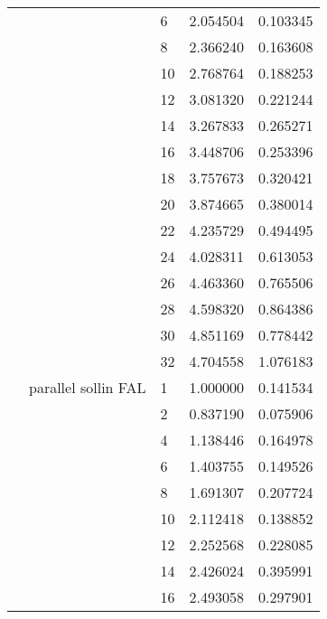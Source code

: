 \begin{tabular}{lllrr}
                      &                     & 6  &  2.054504 &  0.103345 \\
                      &                     & 8  &  2.366240 &  0.163608 \\
                      &                     & 10 &  2.768764 &  0.188253 \\
                      &                     & 12 &  3.081320 &  0.221244 \\
                      &                     & 14 &  3.267833 &  0.265271 \\
                      &                     & 16 &  3.448706 &  0.253396 \\
                      &                     & 18 &  3.757673 &  0.320421 \\
                      &                     & 20 &  3.874665 &  0.380014 \\
                      &                     & 22 &  4.235729 &  0.494495 \\
                      &                     & 24 &  4.028311 &  0.613053 \\
                      &                     & 26 &  4.463360 &  0.765506 \\
                      &                     & 28 &  4.598320 &  0.864386 \\
                      &                     & 30 &  4.851169 &  0.778442 \\
                      &                     & 32 &  4.704558 &  1.076183 \\
                      & parallel sollin FAL & 1  &  1.000000 &  0.141534 \\
                      &                     & 2  &  0.837190 &  0.075906 \\
                      &                     & 4  &  1.138446 &  0.164978 \\
                      &                     & 6  &  1.403755 &  0.149526 \\
                      &                     & 8  &  1.691307 &  0.207724 \\
                      &                     & 10 &  2.112418 &  0.138852 \\
                      &                     & 12 &  2.252568 &  0.228085 \\
                      &                     & 14 &  2.426024 &  0.395991 \\
                      &                     & 16 &  2.493058 &  0.297901 \\

\end{tabular}

